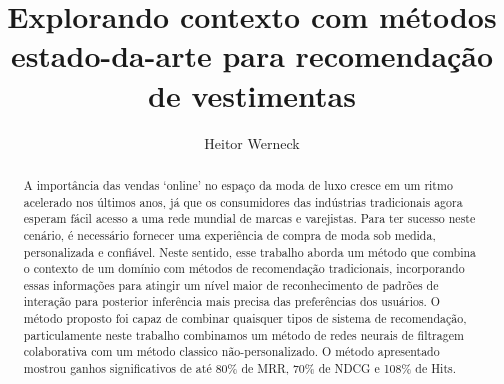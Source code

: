 \documentclass[sigconf]{acmart}
\begin{document}
\title{Explorando contexto com métodos estado-da-arte para recomendação de vestimentas}


\author{Heitor Werneck}

\renewcommand{\shortauthors}{Werneck.}

\begin{abstract}
A importância das vendas ‘online’ no espaço da moda de luxo cresce em um ritmo acelerado nos últimos anos, já que os consumidores das indústrias tradicionais agora esperam fácil acesso a uma rede mundial de marcas e varejistas. Para ter sucesso neste cenário, é necessário fornecer uma experiência de compra de moda sob medida, personalizada e confiável. Neste sentido, esse trabalho aborda um método que combina o contexto de um domínio com métodos de recomendação tradicionais, incorporando essas informações para atingir um nível maior de reconhecimento de padrões de interação para posterior inferência mais precisa das preferências dos usuários. O método proposto foi capaz de combinar quaisquer tipos de sistema de recomendação, particulamente neste trabalho combinamos um método de redes neurais de filtragem colaborativa com um método classico não-personalizado. O método apresentado mostrou ganhos significativos de até 80\% de MRR, 70\% de NDCG e 108\% de Hits.
\end{abstract}

\end{document}
